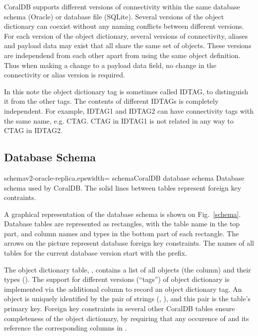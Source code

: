 CoralDB supports different versions of connectivity within the same database schema (Oracle)
or database file (SQLite). Several versions of the object dictionary can coexist without any naming
conflicts between different versions. For each version of the object dictionary, several versions
of connectivity, aliases and payload data may exist that all share the same set of objects. These
versions are independend from each other apart from using the same object definition. Thus when making
a change to a payload data field, no change in the connectivity or alias version is required.

In this note the object dictionary tag is sometimes called IDTAG, to
distinguish it from the other tags.  The contents of different IDTAGs
is completely independent.  For example, IDTAG1 and IDTAG2 can have
connectivity tags with the same name, e.g. CTAG.  CTAG in IDTAG1 is
not related in any way to CTAG in IDTAG2.


\subsection{Database Schema}


{schemav2-oracle-replica.eps}{width=\textwidth}
{schema}{CoralDB database schema}
{Database schema used by CoralDB. The solid lines between tables represent foreign key contraints.}


A graphical representation of the database schema is shown on
Fig.~\ref{schema}.  Database tables are represented as rectangles,
with the table name in the top part, and column names and types in the
bottom part of each rectangle.  The arrows on the picture represent
database foreign key constraints.  The names of all tables for the
current database version start with the  prefix.

The object dictionary table, , contains a list
of all objects (the  column) and their types ().
The support for different versions (``tags'') of object dictionary is
implemented via the additional column  to record an object
dictionary tag.  An object is uniquely identified by the pair of
strings (, ), and this pair is the table's primary
key.  Foreign key constraints in several other CoralDB tables ensure
completeness of the object dictionary, by requiring that any occurence
of  and its  reference the corresponding columns in
.

